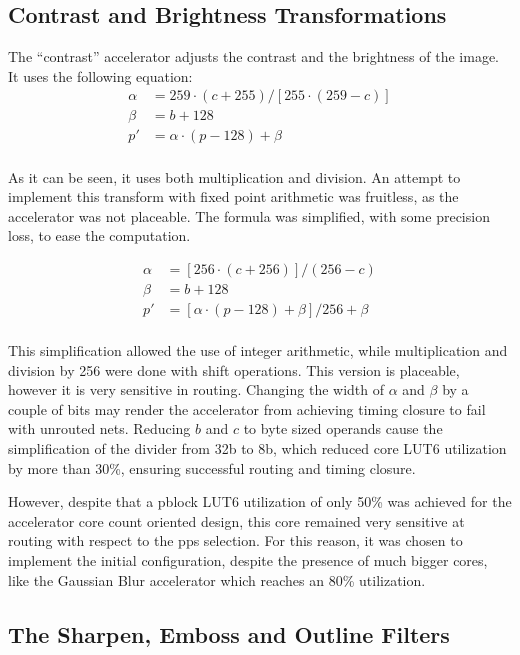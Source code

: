 \subsection{Contrast and Brightness Transformations}
\label{sec:contrast}

The ``contrast'' accelerator adjusts the contrast and the brightness of the image.
It uses the following equation:
\[
\begin{array}{ll}
	\alpha	&= 259 \cdot (c + 255) / \left[ 255 \cdot (259 - c) \right] \\
	\beta	&= b + 128\\
	p' &= \alpha \cdot ( p - 128) + \beta\\
\end{array}
\]

As it can be seen, it uses both multiplication and division. An attempt to implement this
transform with fixed point arithmetic was fruitless, as the accelerator was not
placeable. The formula was simplified, with some precision loss, to ease the computation.

\[
\begin{array}{ll}
	\alpha &= \left[ 256 \cdot (c+256)  \right] / (256 - c) \\
	\beta &= b + 128\\
	p' &= \left[ \alpha \cdot (p - 128) + \beta \right] / 256 + \beta\\
\end{array}
\]

This simplification allowed the use of integer arithmetic, while multiplication
and division by 256 were done with shift operations. This version is placeable,
however it is very sensitive in routing. 
Changing the width of $\alpha$ and $\beta$ by a couple of bits
may render the accelerator from achieving timing closure to fail with unrouted nets.
Reducing $b$ and $c$ to byte sized operands cause the simplification of the divider
from 32b to 8b, which reduced core LUT6 utilization by more than 30\%, ensuring
successful routing and timing closure.

However, despite that a \gls{pblock} LUT6 utilization of only 50\% was achieved
for the accelerator core count oriented design,
this core remained very sensitive at routing with respect to the \glspl{pp} selection.
For this reason, it was chosen to implement the initial configuration,
despite the presence of much bigger cores, like the Gaussian Blur accelerator
which reaches an 80\% utilization.

\subsection{The Sharpen, Emboss and Outline Filters}

